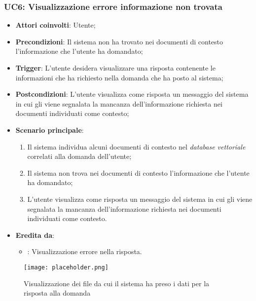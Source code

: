 \subsubsection{UC6: Visualizzazione errore informazione non trovata}
\begin{itemize}
    \item \textbf{Attori coinvolti}: Utente;
    \item \textbf{Precondizioni}: Il sistema non ha trovato nei documenti di contesto l'informazione che l'utente ha domandato;
    \item \textbf{Trigger}: L'utente desidera visualizzare una risposta contenente le informazioni che ha richiesto nella domanda che ha posto al sistema;
    \item \textbf{Postcondizioni}: L'utente visualizza come risposta un messaggio del sistema in cui gli viene segnalata la mancanza dell'informazione 
    richiesta nei documenti individuati come contesto;
    \item \textbf{Scenario principale}:
    \begin{enumerate}
        \item Il sistema individua alcuni documenti di contesto nel \emph{database vettoriale} correlati alla domanda dell'utente;
        \item Il sistema non trova nei documenti di contesto l'informazione che l'utente ha domandato;
        \item L'utente visualizza come risposta un messaggio del sistema in cui gli viene segnalata la mancanza dell'informazione richiesta 
        nei documenti individuati come contesto.
    \end{enumerate}
    \item \textbf{Eredita da}:
    \begin{itemize}
        \item {}: Visualizzazione errore nella risposta.
    \end{itemize}
\end{itemize}


\hypertarget{UC2.1}{}

\begin{figure}[h]
    \centering
    \texttt{[image: placeholder.png]}
    \caption{Visualizzazione dei file da cui il sistema ha preso i dati per la risposta alla domanda}
\end{figure}

